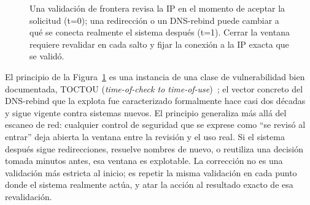 \documentclass[10pt]{article}
\begin{document}
\begin{figure}[H]
\centering
{}
\caption{Una validación de frontera revisa la IP en el momento de aceptar la solicitud (t=0); una redirección o un DNS-rebind puede cambiar a qué se conecta realmente el sistema después (t=1). Cerrar la ventana requiere revalidar en cada salto y fijar la conexión a la IP exacta que se validó.}
\label{fig:toctou}
\end{figure}

El principio de la Figura~\ref{fig:toctou} es una instancia de una clase de vulnerabilidad bien documentada, TOCTOU (\emph{time-of-check to time-of-use})~\cite{cwe367}; el vector concreto del DNS-rebind que la explota fue caracterizado formalmente hace casi dos décadas~\cite{dnsrebind2007} y sigue vigente contra sistemas nuevos. El principio generaliza más allá del escaneo de red: cualquier control de seguridad que se exprese como ``se revisó al entrar'' deja abierta la ventana entre la revisión y el uso real. Si el sistema después sigue redirecciones, resuelve nombres de nuevo, o reutiliza una decisión tomada minutos antes, esa ventana es explotable. La corrección no es una validación más estricta al inicio; es repetir la misma validación en cada punto donde el sistema realmente actúa, y atar la acción al resultado exacto de esa revalidación.
\end{document}
